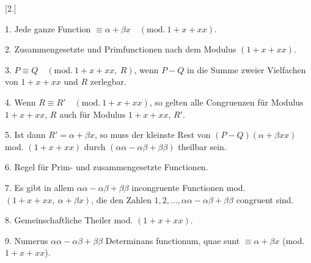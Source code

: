 \clearpage{}
\begin{center}\end{center}
\begin{center}[2.]\end{center}
\noindent\hspace*{\parindent}1. Jede ganze Function $\equiv \alpha+\beta x \quad(\mathrm{mod.}\ 1+x+xx)$.

2. Zusammengesetzte und Primfunctionen nach dem Modulus $(1+x+xx)$.

3. $P \equiv Q \quad(\mathrm{mod.}\ 1+x+xx,\ R)$,
wenn $P-Q$ in die Summe zweier Vielfachen von $1+x+xx$ und $R$ zerlegbar.

4. Wenn $R \equiv R' \quad(\mathrm{mod.}\ 1+x+xx)$, so gelten alle Congruenzen für
Modulus $1+x+xx$, $R$ auch für Modulus $1+x+xx$, $R'$.

5. Ist dann $R' = \alpha+\beta x$, so muss der kleinste Rest von
$(P-Q)(\alpha+\beta xx)$ mod. $(1+x+xx)$ durch $(\alpha\alpha-\alpha\beta+\beta\beta)$
theilbar sein.

6. Regel für Prim- und zusammengesetzte Functionen.

7. Es gibt in allem $\alpha\alpha-\alpha\beta+\beta\beta$ incongruente
Functionen mod. $(1+x+xx,\ \alpha+\beta x)$, die den Zahlen $1, 2, \ldots,
\alpha\alpha-\alpha\beta+\beta\beta$ congruent sind.

8. Gemeinschaftliche Theiler mod. $(1+x+xx)$.

9. Numerus $\alpha\alpha-\alpha\beta+\beta\beta$ Determinans functionum,
quae sunt $\equiv \alpha+\beta x$ (mod. $1+x+xx$).

